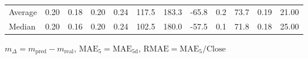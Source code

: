 \begin{threeparttable}
{\begin{tabular}{lrrrrrrrrrrr}
Average &          0.20 &          0.18 &          0.20 &        0.24 &               117.5 &               183.3 &      -65.8 &                 0.2 &             73.7 &            0.19 &                  21.00 \\
 Median &          0.20 &          0.16 &          0.20 &        0.24 &               102.5 &               180.0 &      -57.5 &                 0.1 &             71.8 &            0.18 &                  25.00 \\
\bottomrule
\end{tabular}
}
\begin{tablenotes}\footnotesize
\item $m_\Delta=m_{\text{pred}}-m_{\text{real}}$,
$\mathrm{MAE}_5=\mathrm{MAE}_{5\text{d}}$,
$\mathrm{RMAE}=\mathrm{MAE}_5/\text{Close}$
\end{tablenotes}
\end{threeparttable}
\endgroup

